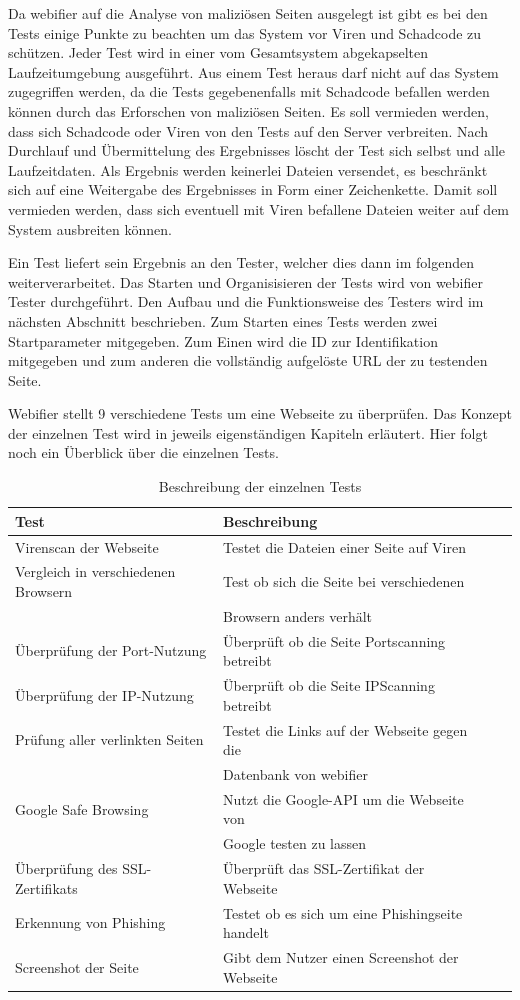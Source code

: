 Da webifier auf die Analyse von maliziösen Seiten ausgelegt ist gibt es bei den Tests einige Punkte zu beachten um das System vor Viren und Schadcode zu schützen.
Jeder Test wird in einer vom Gesamtsystem abgekapselten Laufzeitumgebung ausgeführt. Aus einem Test heraus darf nicht auf das System zugegriffen werden, da die Tests gegebenenfalls mit Schadcode befallen werden können durch das Erforschen von maliziösen Seiten. Es soll vermieden werden, dass sich Schadcode oder Viren von den Tests auf den Server verbreiten. Nach Durchlauf und Übermittelung des Ergebnisses löscht der Test sich selbst und alle Laufzeitdaten. Als Ergebnis werden keinerlei Dateien versendet, es beschränkt sich auf eine Weitergabe des Ergebnisses in Form einer Zeichenkette. Damit soll vermieden werden, dass sich eventuell mit Viren befallene Dateien weiter auf dem System ausbreiten können.

Ein Test liefert sein Ergebnis an den Tester, welcher dies dann im folgenden weiterverarbeitet.
Das Starten und Organisisieren der Tests wird von webifier Tester durchgeführt. Den Aufbau und die Funktionsweise des Testers wird im nächsten Abschnitt beschrieben. Zum Starten eines Tests werden zwei Startparameter mitgegeben. Zum Einen wird die ID zur Identifikation mitgegeben und zum anderen die vollständig aufgelöste URL der zu testenden Seite.

Webifier stellt 9 verschiedene Tests um eine Webseite zu überprüfen. Das Konzept der einzelnen Test wird in jeweils eigenständigen Kapiteln erläutert. Hier folgt noch ein Überblick über die einzelnen Tests.

\begin{table}[H]
\centering
\begin{tabular}{|l|l|l|l|}
\hline
\textbf{Test} & \textbf{Beschreibung} \\\hline
Virenscan der Webseite & Testet die Dateien einer Seite auf Viren \\\hline
Vergleich in verschiedenen Browsern & Test ob sich die Seite bei verschiedenen \\ & Browsern anders verhält \\\hline
Überprüfung der Port-Nutzung & Überprüft ob die Seite Portscanning betreibt \\\hline
Überprüfung der IP-Nutzung & Überprüft ob die Seite IPScanning betreibt \\\hline
Prüfung aller verlinkten Seiten & Testet die Links auf der Webseite gegen die \\ & Datenbank von webifier \\\hline
Google Safe Browsing & Nutzt die Google-API um die Webseite von \\ & Google testen zu lassen \\\hline
Überprüfung des SSL-Zertifikats & Überprüft das SSL-Zertifikat der Webseite \\\hline
Erkennung von Phishing & Testet ob es sich um eine Phishingseite handelt \\\hline
Screenshot der Seite & Gibt dem Nutzer einen Screenshot der Webseite \\\hline
\end{tabular}
\caption{Beschreibung der einzelnen Tests}
\label{tbl:tests}
\end{table}

